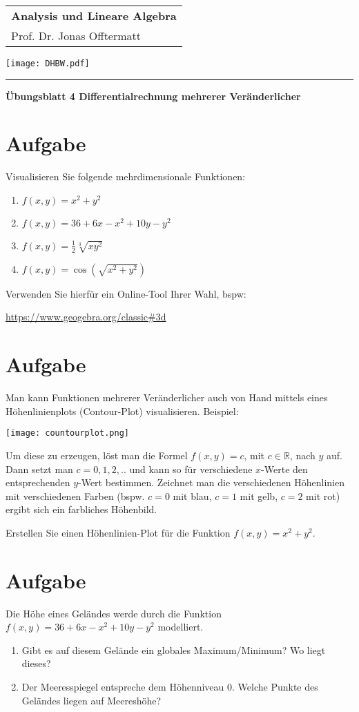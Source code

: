 \documentclass[fontsize=11pt, parskip=half]{scrartcl}
\newcommand{\R}{\mathbb{R}}
\begin{document}
\noindent
\begin{tabular}{l}
    \textbf{Analysis und Lineare Algebra} \\    
    Prof. Dr. Jonas Offtermatt
\end{tabular}
\hfill \texttt{[image: DHBW.pdf]}\\
\rule{\textwidth}{0.5pt}


\begin{center}
    \Large
    \textbf{Übungsblatt 4 Differentialrechnung mehrerer Veränderlicher}
\end{center}
\section{Aufgabe}
Visualisieren Sie folgende mehrdimensionale Funktionen:
\begin{enumerate}[label=\alph*)]
    \item $f(x,y) = x^2 + y^2$
    \item $f(x,y) = 36 + 6x -x^2 + 10 y - y^2$
    \item $f(x,y) = \frac{1}{2}\sqrt[3]{x y^2}$
    \item $f(x,y) = \cos (\sqrt{x^2 + y^2})$
\end{enumerate}
Verwenden Sie hierfür ein Online-Tool Ihrer Wahl, bspw: 

\url{https://www.geogebra.org/classic#3d}

\section{Aufgabe}
Man kann Funktionen mehrerer Veränderlicher auch von Hand mittels eines Höhenlinienplots (Contour-Plot) visualisieren. 
Beispiel:

\texttt{[image: countourplot.png]}


Um diese zu erzeugen, löst man die Formel $f(x,y) = c$, mit $c \in \R$, nach $y$ auf. Dann setzt man $c = 0,1,2,..$ und kann so für verschiedene $x$-Werte den entsprechenden $y$-Wert bestimmen. Zeichnet man die verschiedenen Höhenlinien mit verschiedenen Farben (bspw. $c=0$ mit blau, $c=1$ mit gelb, $c= 2$ mit rot) ergibt sich ein farbliches Höhenbild.

Erstellen Sie einen Höhenlinien-Plot für die Funktion $f(x,y) = x^2 + y^2$.


\section{Aufgabe}
Die Höhe eines Geländes werde durch die Funktion $f(x,y) = 36 + 6x -x^2 + 10 y - y^2$ modelliert.
\begin{enumerate}[label=\alph*)]
    \item Gibt es auf diesem Gelände ein globales Maximum/Minimum? Wo liegt dieses?
    \item Der Meeresspiegel entspreche dem Höhenniveau $0$. Welche Punkte des Geländes liegen auf Meereshöhe?
\end{enumerate}
\end{document}
